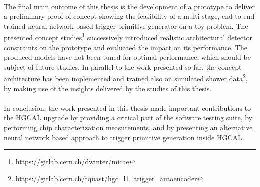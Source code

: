 \documentclass[../../main.tex]{subfiles}
\begin{document}
\\
The final main outcome of this thesis is the development of a prototype to deliver a preliminary proof-of-concept showing the feasibility of a multi-stage, end-to-end trained neural network based trigger primitive generator on a toy problem. The presented concept studies\footnote{\url{https://gitlab.cern.ch/dwinter/micae}} successively introduced realistic architectural detector constraints on the prototype and evaluated the impact on its performance. The produced models have not been tuned for optimal performance, which should be subject of future studies. In parallel to the work presented so far, the concept architecture has been implemented and trained also on simulated shower data\footnote{\url{https://gitlab.cern.ch/tquast/hgc_l1_trigger_autoencoder}}, by making use of the insights delivered by the studies of this thesis.\\
\\
In conclusion, the work presented in this thesis made important contributions to the HGCAL upgrade by providing a critical part of the software testing suite, by performing chip characterization measurements, and by presenting an alternative neural network based approach to trigger primitive generation inside HGCAL.
\end{document}
